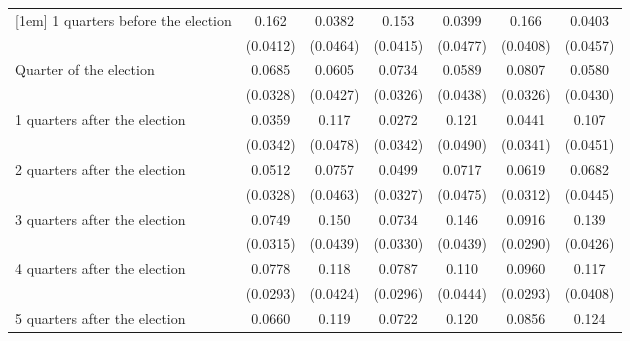 \begin{table}[htbp]
\begin{tabular}{l*{6}{c}}
[1em]
 1 quarters before the election&       0.162\sym{***}&      0.0382         &       0.153\sym{***}&      0.0399         &       0.166\sym{***}&      0.0403         \\
                    &    (0.0412)         &    (0.0464)         &    (0.0415)         &    (0.0477)         &    (0.0408)         &    (0.0457)         \\
[1em]
Quarter of the election&      0.0685\sym{*}  &      0.0605         &      0.0734\sym{*}  &      0.0589         &      0.0807\sym{*}  &      0.0580         \\
                    &    (0.0328)         &    (0.0427)         &    (0.0326)         &    (0.0438)         &    (0.0326)         &    (0.0430)         \\
[1em]
 1 quarters after the election&      0.0359         &       0.117\sym{*}  &      0.0272         &       0.121\sym{*}  &      0.0441         &       0.107\sym{*}  \\
                    &    (0.0342)         &    (0.0478)         &    (0.0342)         &    (0.0490)         &    (0.0341)         &    (0.0451)         \\
[1em]
 2 quarters after the election&      0.0512         &      0.0757         &      0.0499         &      0.0717         &      0.0619\sym{*}  &      0.0682         \\
                    &    (0.0328)         &    (0.0463)         &    (0.0327)         &    (0.0475)         &    (0.0312)         &    (0.0445)         \\
[1em]
 3 quarters after the election&      0.0749\sym{*}  &       0.150\sym{***}&      0.0734\sym{*}  &       0.146\sym{***}&      0.0916\sym{**} &       0.139\sym{**} \\
                    &    (0.0315)         &    (0.0439)         &    (0.0330)         &    (0.0439)         &    (0.0290)         &    (0.0426)         \\
[1em]
 4 quarters after the election&      0.0778\sym{**} &       0.118\sym{**} &      0.0787\sym{**} &       0.110\sym{*}  &      0.0960\sym{**} &       0.117\sym{**} \\
                    &    (0.0293)         &    (0.0424)         &    (0.0296)         &    (0.0444)         &    (0.0293)         &    (0.0408)         \\
[1em]
 5 quarters after the election&      0.0660         &       0.119\sym{**} &      0.0722\sym{*}  &       0.120\sym{**} &      0.0856\sym{*}  &       0.124\sym{**} \\

\end{tabular}
\end{table}
